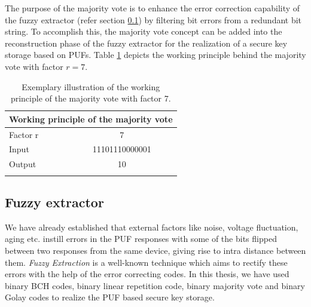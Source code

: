 The purpose of the majority vote is to enhance the error correction capability of the fuzzy extractor (refer section \ref{fuzzy_section}) by filtering bit errors from a redundant bit string. To accomplish this, the majority vote concept can be added into the reconstruction phase of the fuzzy extractor for the realization of a secure key storage based on PUFs. Table \ref{mv} depicts the working principle behind the majority vote with factor $r = 7$.

\begin{table}[!ht]
\begin{center}
\begin{tabular}{lc}
\toprule
\multicolumn{2}{c}{\textbf{Working principle of the majority vote}}\\
\midrule
Factor r & 7 \\
Input & 11101110000001\\
Output & 10\\
\addlinespace
\bottomrule
\end{tabular}
\end{center}
\caption{Exemplary illustration of the working principle of the majority vote with factor 7.}
\label{mv}
\end{table}

\subsection{Fuzzy extractor}
\label{fuzzy_section}
We have already established that external factors like noise, voltage fluctuation, aging etc. instill errors in the PUF responses with some of the bits flipped between two responses from the same device, giving rise to intra distance between them. \emph{Fuzzy Extraction} is a well-known technique which aims to rectify these errors with the help of the error correcting codes. In this thesis, we have used binary BCH codes, binary linear repetition code, binary majority vote and binary Golay
codes to realize the PUF based secure key storage.\\

